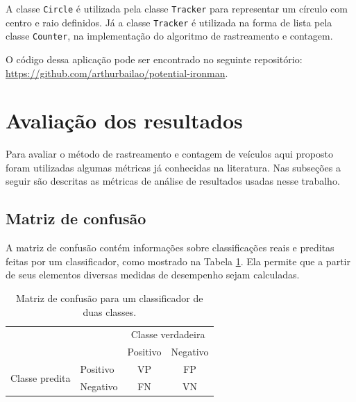 A classe \verb!Circle! é utilizada pela classe \verb!Tracker! para representar um círculo com centro e raio definidos. Já a classe \verb!Tracker! é utilizada na forma de lista pela classe \verb!Counter!, na implementação do algoritmo de rastreamento e contagem.

O código dessa aplicação pode ser encontrado no seguinte repositório: \url{https://github.com/arthurbailao/potential-ironman}.


\section{Avaliação dos resultados} %
\label{sec:avalia_o_dos_resultados}

Para avaliar o método de rastreamento e contagem de veículos aqui proposto foram utilizadas algumas métricas já conhecidas na literatura. Nas subseções a seguir são descritas as métricas de análise de resultados usadas nesse trabalho.

\subsection{Matriz de confusão} %
\label{sub:matriz_de_confus_o}

A matriz de confusão contém informações sobre classificações reais e preditas feitas por um classificador, como mostrado na Tabela \ref{tab:matriz_de_confusao}. Ela permite que a partir de seus elementos diversas medidas de desempenho sejam calculadas.

\begin{table}[ht]
  \caption{Matriz de confusão para um classificador de duas classes.}
  \label{tab:matriz_de_confusao}
  \begin{center}
    \begin{tabular}{l|l|c|c|}

    \multicolumn{2}{c}{} & \multicolumn{2}{c}{Classe verdadeira} \\
    \cline{3-4}
    \multicolumn{2}{c|}{} & Positivo & Negativo \\
    \cline{2-4}
    \multirow{2}{*}{Classe predita} & Positivo & VP & FP \\
    \cline{2-4}
    & Negativo & FN & VN \\
    \cline{2-4}
    
    \end{tabular}
  \end{center}
\end{table}

